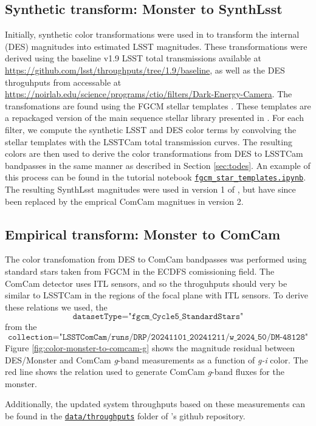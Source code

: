 \subsection{Synthetic transform: Monster to  SynthLsst}
Initially, synthetic color transformations were used in \monster to transform the internal (DES) magnitudes into estimated LSST magnitudes. 
These transformations were derived using the baseline v1.9 LSST total transmissions available at \url{https://github.com/lsst/throughputs/tree/1.9/baseline}, as well as the DES throguhputs from \citet{Abbott:2021} accessable at \url{https://noirlab.edu/science/programs/ctio/filters/Dark-Energy-Camera}.
The transfomations are found using the FGCM stellar templates \citep{Burke:2018}. 
These templates are a repackaged version of the main sequence stellar library presented in \citet{Kelly:2012}.
For each filter, we compute the synthetic LSST and DES color terms by convolving the stellar templates with the LSSTCam total transmission curves.
The resulting colors are then used to derive the color transformations from DES to LSSTCam bandpasses in the same manner as described in Section \ref{sec:todes}.
An example of this process can be found in the tutorial notebook \href{https://github.com/lsst-dm/the_monster/blob/main/notebooks/fgcm_star_templates.ipynb}{\texttt{fgcm\_star\_templates.ipynb}}.
The resulting SynthLsst magnitudes were used in version 1 of \monster, but have since been replaced by the emprical ComCam magnitues in version 2.

\subsection{Empirical transform: Monster to ComCam}
\label{sec:tocomcam}
The color transfomation from DES to ComCam bandpasses was performed using standard stars taken from FGCM in the ECDFS comissioning field. 
The ComCam detector uses ITL sensors, and so the throguhputs should very be similar to LSSTCam in the regions of the focal plane with ITL sensors. 
To derive these relations we used, the $$\texttt{datasetType="fgcm\_Cycle5\_StandardStars"}$$ from the $$\texttt{collection="LSSTComCam/runs/DRP/20241101\_20241211/w\_2024\_50/DM-48128"}$$
Figure \ref{fig:color-monster-to-comcam-g} shows the magnitude residual between DES/Monster and ComCam \textit{g}-band measurements as a function of \textit{g-i} color. 
The red line shows the relation used to generate ComCam \textit{g}-band fluxes for the monster.

Additionally, the updated system throughputs based on these measurements can be found in the \href{https://github.com/lsst-dm/the_monster/tree/main/data/throughputs}{\texttt{data/throughputs}} folder of \monster's github repository.


